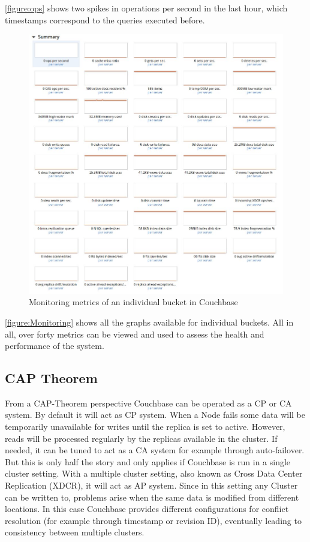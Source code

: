 \autoref{figure:ops} shows two spikes in operations per second in the last hour, which timestamps correspond to the queries executed before.

\begin{figure}[H]
    \centering
    \includegraphics[width=\textwidth]{img/couchbaseMonitor.jpg}
    \caption{Monitoring metrics of an individual bucket in Couchbase}
    \label{figure:Monitoring}
\end{figure}

\autoref{figure:Monitoring} shows all the graphs available for individual buckets. All in all, over forty metrics can be viewed and used to assess the health and performance of the system.

\subsection{CAP Theorem}
From a CAP-Theorem perspective Couchbase can be operated as a CP or CA system. By default it will act as CP system. When a Node fails some data will be temporarily unavailable for writes until the replica is set to active. However, reads will be processed regularly by the replicas available in the cluster. If needed, it can be tuned to act as a CA system for example through auto-failover. But this is only half the story and only applies if Couchbase is run in a single cluster setting. With a multiple cluster setting, also known as Cross Data Center Replication (XDCR), it will act as AP system. Since in this setting any Cluster can be written to, problems arise when the same data is modified from different locations. In this case Couchbase provides different configurations for conflict resolution (for example through timestamp or revision ID), eventually leading to consistency between multiple clusters. \parencite{couchbaseCAP}

